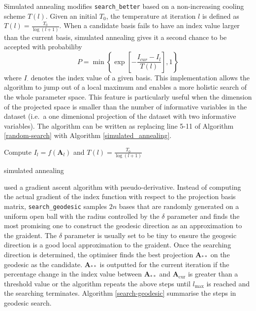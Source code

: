 \documentclass[12pt]{article}
\begin{document}
Simulated annealing
\citep[\citet{kirkpatrick1983optimization}]{bertsimas1993simulated}
modifies \texttt{search\_better} based on a non-increasing cooling
scheme \(T(l)\). Given an initial \(T_0\), the temperature at iteration
\(l\) is defined as \(T(l) = \frac{T_0}{\log(l + 1)}\). When a candidate
basis fails to have an index value larger than the current basis,
simulated annealing gives it a second chance to be accepted with
probabiliby
\[P= \min\left\{\exp\left[-\frac{I_{cur} - I_{l}}{T(l)}\right],1\right\}\]
where \(I_{\cdot}\) denotes the index value of a given basis. This
implementation allows the algorithm to jump out of a local maximum and
enables a more holistic search of the whole parameter space. This
feature is particularly useful when the dimension of the projected space
is smaller than the number of informative variables in the dataset
(i.e.~a one dimenional projection of the dataset with two informative
variables). The algorithm can be written as replacing line 5-11 of
Algorithm \ref{random-search} with Algorithm \ref{simulated_annealing}.

\begin{algorithm}
\SetAlgoLined
    Compute $I_{l} = f(\mathbf{A}_{l})$ and $T(l) = \frac{T_0}{\log(l + 1)}$\;
  \caption{simulated annealing}
  \label{simulated_annealing}
\end{algorithm}

\citet{cook1995grand} used a gradient ascent algorithm with
pseudo-derivative. Instead of computing the actual gradient of the index
function with respect to the projection basis matrix,
\texttt{search\_geodesic} samples \(2n\) bases that are randomly
generated on a uniform open ball with the radius controlled by the
\(\delta\) parameter and finds the most promising one to construct the
geodesic direction as an approximation to the graident. The \(\delta\)
parameter is usually set to be tiny to ensure the geogesic direction is
a good local approximation to the graident. Once the searching direction
is determined, the optimiser finds the best projection
\(\mathbf{A}_{**}\) on the geodesic as the candidate.
\(\mathbf{A}_{**}\) is outputted for the current iteration if the
percentage change in the index value between \(\mathbf{A}_{**}\) and
\(\mathbf{A}_{\text{cur}}\) is greater than a threshold value or the
algorithm repeats the above steps until \(l_{\max}\) is reached and the
searching terminates. Algorithm \ref{search-geodesic} summarise the
steps in geodesic search.
\end{document}
